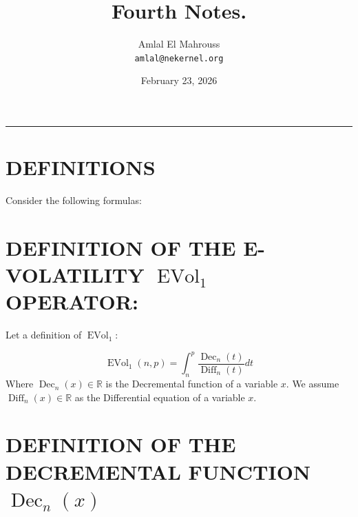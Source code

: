 \documentclass[11pt, a4paper]{article}
\title{Fourth Notes.}
\author{Amlal El Mahrouss\\\texttt{amlal@nekernel.org}}
\date{February 23, 2026}
\begin{document}
\maketitle

\begin{center}
	\rule[0.01cm]{17cm}{0.01cm}
\end{center}

\section{DEFINITIONS}

Consider the following formulas: 

\section{DEFINITION OF THE E-VOLATILITY $\operatorname{EVol}_{1}$ OPERATOR:}

Let a definition of $\operatorname{EVol}_{1}$:

\begin{equation}
    \operatorname{EVol}_{1}(n, p) = \int_{n}^{p} \frac{\operatorname{Dec}_{n}(t)}{\operatorname{Diff}_{n}(t)}dt
\end{equation}
Where $\operatorname{Dec}_{n}(x) \in \mathbb{R}$ is the Decremental function of a variable $x$. We assume $\operatorname{Diff}_{n}(x) \in \mathbb{R}$ as the Differential equation of a variable $x$.

\section{DEFINITION OF THE DECREMENTAL FUNCTION $\operatorname{Dec}_{n}(x)$}
\end{document}
